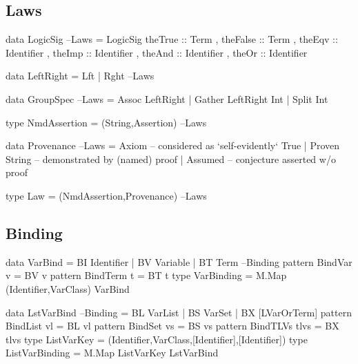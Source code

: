 \subsection{Laws}

\begin{code}
data LogicSig                                                           --Laws
  = LogicSig
     { theTrue  :: Term
     , theFalse :: Term
     , theEqv   :: Identifier
     , theImp   :: Identifier
     , theAnd   :: Identifier
     , theOr    :: Identifier
     }
\end{code}

\begin{code}
data LeftRight = Lft | Rght                                             --Laws

data GroupSpec                                                          --Laws
  = Assoc LeftRight
  | Gather LeftRight Int
  | Split Int
\end{code}

\begin{code}
type NmdAssertion = (String,Assertion)                                  --Laws
\end{code}

\begin{code}
data Provenance                                                         --Laws
  = Axiom          --  considered as `self-evidently` True
  | Proven String  --  demonstrated by (named) proof
  | Assumed        --  conjecture asserted w/o proof
\end{code}

\begin{code}
type Law = (NmdAssertion,Provenance)                                    --Laws
\end{code}

\subsection{Binding}

\begin{code}
data VarBind = BI Identifier | BV Variable | BT Term                 --Binding
pattern BindVar  v  =  BV v
pattern BindTerm t  =  BT t
type VarBinding = M.Map (Identifier,VarClass) VarBind
\end{code}

\begin{code}
data LstVarBind                                                      --Binding
 = BL  VarList
 | BS  VarSet
 | BX  [LVarOrTerm]
pattern BindList vl      =  BL vl
pattern BindSet  vs      =  BS vs
pattern BindTLVs tlvs    =  BX tlvs
type ListVarKey = (Identifier,VarClass,[Identifier],[Identifier])
type ListVarBinding = M.Map ListVarKey LstVarBind
\end{code}

